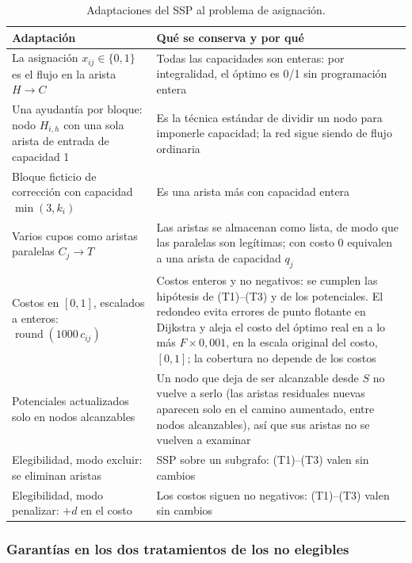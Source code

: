 \documentclass{article}
\begin{document}
\begin{table}[H]
\centering
\small
\begin{tabularx}{\textwidth}{>{\raggedright\arraybackslash}p{4.2cm} >{\raggedright\arraybackslash}X}
\toprule
\textbf{Adaptación} & \textbf{Qué se conserva y por qué} \\
\midrule
La asignación $x_{ij} \in \{0,1\}$ es el flujo en la arista $H \to C$ & Todas las capacidades son enteras: por integralidad, el óptimo es 0/1 sin programación entera \\
Una ayudantía por bloque: nodo $H_{i,h}$ con una sola arista de entrada de capacidad 1 & Es la técnica estándar de dividir un nodo para imponerle capacidad; la red sigue siendo de flujo ordinaria \\
Bloque ficticio de corrección con capacidad $\min(3, k_i)$ & Es una arista más con capacidad entera \\
Varios cupos como aristas paralelas $C_j \to T$ & Las aristas se almacenan como lista, de modo que las paralelas son legítimas; con costo 0 equivalen a una arista de capacidad $q_j$ \\
Costos en $[0, 1]$, escalados a enteros: $\operatorname{round}(1000\, c_{ij})$ & Costos enteros y no negativos: se cumplen las hipótesis de (T1)--(T3) y de los potenciales. El redondeo evita errores de punto flotante en Dijkstra y aleja el costo del óptimo real en a lo más $F \times 0{,}001$, en la escala original del costo, $[0, 1]$; la cobertura no depende de los costos \\
Potenciales actualizados solo en nodos alcanzables & Un nodo que deja de ser alcanzable desde $S$ no vuelve a serlo (las aristas residuales nuevas aparecen solo en el camino aumentado, entre nodos alcanzables), así que sus aristas no se vuelven a examinar \\
Elegibilidad, modo excluir: se eliminan aristas & SSP sobre un subgrafo: (T1)--(T3) valen sin cambios \\
Elegibilidad, modo penalizar: $+d$ en el costo & Los costos siguen no negativos: (T1)--(T3) valen sin cambios \\
\bottomrule
\end{tabularx}
\caption{Adaptaciones del SSP al problema de asignación.}
\label{tab:adaptacion}
\end{table}

\subsubsection{Garantías en los dos tratamientos de los no elegibles}
\end{document}
